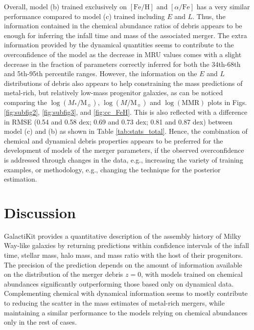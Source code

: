 Overall, model (b) trained exclusively on $[\mathrm{Fe}/\mathrm{H}]$ and $[\alpha/\mathrm{Fe}]$ has a very similar performance compared to model (c) trained including $E$ and $L$. Thus, the information contained in the chemical abundance ratios of debris appears to be enough for inferring the infall time and mass of the associated merger. The extra information provided by the dynamical quantities seems to contribute to the overconfidence of the model as the decrease in MRU values comes with a slight decrease in the fraction of parameters correctly inferred for both the 34th-68th and 5th-95th percentile ranges. However, the information on the $E$ and $L$ distributions of debris also appears to help constraining the mass predictions of metal-rich, but relatively low-mass progenitor galaxies, as can be noticed comparing the $\log(M_*/\mathrm{M}_{\sun})$, $\log(M/\mathrm{M}_{\sun})$ and $\log(\mathrm{MMR})$ plots in Figs. \ref{fig:subfig2}, \ref{fig:subfig3}, and \ref{fig:cc_FeH}. This is also reflected with a difference in RMSE (0.54 and 0.58 dex; 0.69 and 0.73 dex; 0.81 and 0.87 dex) between model (c) and (b) as shown in Table \ref{tab:stats_total}. Hence, the combination of chemical and dynamical debris properties appears to be preferred for the development of models of the merger parameters, if the observed overconfidence is addressed through changes in the data, e.g.,  increasing the variety of training examples, or methodology, e.g., changing the technique for the posterior estimation.


\section{Discussion}
\label{sec:discussions}

GalactiKit provides a quantitative description of the assembly history of Milky Way-like galaxies by returning predictions within confidence intervals of the infall time, stellar mass, halo mass, and mass ratio with the host of their progenitors. The precision of the prediction depends on the amount of information available on the distribution of the merger debris $z=0$, with models trained on chemical abundances significantly outperforming those based only on dynamical data. Complementing chemical with dynamical information seems to mostly contribute to reducing the scatter in the mass estimates of metal-rich mergers, while maintaining a similar performance to the models relying on chemical abundances only in the rest of cases. 

